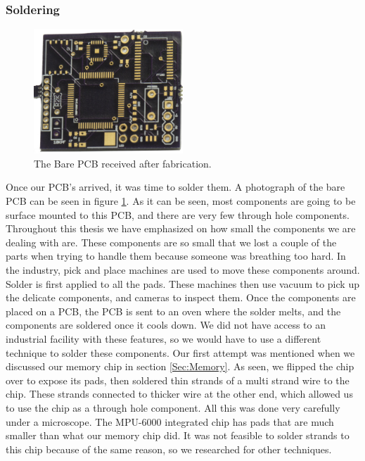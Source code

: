 \subsubsection{Soldering}
\label{Sec:Soldering}
\begin{figure}
\begin{center}
\includegraphics[width=0.5\textwidth]{images/BarePCB.jpg}
\caption{The Bare PCB received after fabrication.}
\label{Fig:PCBBare}
\end{center}
\end{figure}
Once our PCB's arrived, it was time to solder them.
A photograph of the bare PCB can be seen in figure \ref{Fig:PCBBare}.
As it can be seen,
most components are going to be surface mounted to this PCB,
and there are very few through hole components.
Throughout this thesis we have emphasized on how small the components we are dealing with are.
These components are so small that we lost a couple of the parts when trying to handle them because someone was breathing too hard.
In the industry,
pick and place machines are used to move these components around.
Solder is first applied to all the pads.
These machines then use vacuum to pick up the delicate components,
and cameras to inspect them. 
Once the components are placed on a PCB,
the PCB is sent to an oven where the solder melts,
and the components are soldered once it cools down.
We did not have access to an industrial facility with these features,
so we would have to use a different technique to solder these components.
Our first attempt was mentioned when we discussed our memory chip in section \ref{Sec:Memory}.
As seen, we flipped the chip over to expose its pads,
then soldered thin strands of a multi strand wire to the chip.
These strands connected to thicker wire at the other end,
which allowed us to use the chip as a through hole component.
All this was done very carefully under a microscope.
The MPU-6000 integrated chip has pads that are much smaller than what our memory chip did.
It was not feasible to solder strands to this chip because of the same reason,
so we researched for other techniques.

